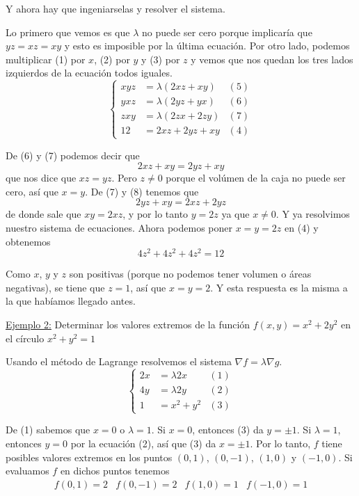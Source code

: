 \documentclass[12pt]{article}
\begin{document}
Y ahora hay que ingeniarselas y resolver el sistema.

Lo primero que vemos es que $ \lambda $ no puede ser cero porque implicaría que $ yz=xz=xy $ y esto es imposible por la última ecuación. Por otro lado, podemos multiplicar (1) por $ x $, (2) por $ y $ y (3) por $ z $ y vemos que nos quedan los tres lados izquierdos de la ecuación todos iguales.
\[
  \left\{
  \begin{aligned}
	  xyz &= \lambda \left(2xz+xy\right) & (5)\\
	  yxz &= \lambda \left(2yz+yx\right) & (6)\\
	  zxy &= \lambda \left(2zx+2zy\right) & (7)\\
	  12 &=2xz + 2yz + xy & (4)
  \end{aligned}
  \right.
\]

De (6) y (7) podemos decir que 
\[
  2xz + xy = 2yz + xy
\]
que nos dice que $ xz=yz $. Pero $ z\neq 0 $ porque el volúmen de la caja no puede ser cero, así que $ x=y $. De (7) y (8) tenemos que
\[
  2yz + xy = 2xz + 2yz
\]
de donde sale que $ xy=2xz $, y por lo tanto $ y=2z $ ya que $ x\neq 0 $. Y ya resolvimos nuestro sistema de ecuaciones. Ahora podemos poner $ x=y=2z $ en (4) y obtenemos
\[
  4z^2+4z^2+4z^2 = 12
\]

Como $ x $, $ y $ y $ z $ son positivas (porque no podemos tener volumen o áreas negativas), se tiene que $ z=1 $, así que $ x=y=2 $. Y esta respuesta es la misma a la que habíamos llegado antes.

\underline{Ejemplo 2:} Determinar los valores extremos de la función $ f(x,y)=x^2+2y^2 $ en el círculo $ x^2+y^2=1 $

Usando el método de Lagrange resolvemos el sistema $ \nabla f = \lambda \nabla g $.
\[
  \left\{
  \begin{aligned}
	  2x &= \lambda 2x & (1) \\
	  4y &= \lambda 2y & (2) \\
	  1 &= x^2 + y^2 & (3)
  \end{aligned}
  \right.
\]

De (1) sabemos que $ x=0 $ o $ \lambda = 1 $. Si $ x=0 $, entonces (3) da $ y=\pm 1 $. Si $ \lambda = 1 $, entonces $ y=0 $ por la ecuación (2), así que (3) da $ x=\pm1 $. Por lo tanto, $ f $ tiene posibles valores extremos en los puntos $ (0,1) $, $ (0,-1) $, $ (1,0) $ y $ (-1,0) $. Si evaluamos $ f $ en dichos puntos tenemos 
\begin{align*}
  f(0,1) = 2 & f(0,-1)=2 & f(1,0)=1 & f(-1,0) = 1
\end{align*}
\end{document}

